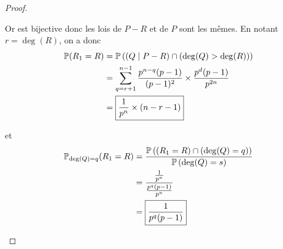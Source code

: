 \begin{proof}
\begin{enumerate}
        Or 
        est bijective donc les lois de $P-R$ et de $P$ sont les mêmes. En notant $r=\deg(R)$, on a donc 
        \begin{align}
            \P(R_{1}=R)
            &=\P\left((Q\mid P-R)\cap(\deg(Q)>\deg(R))\right)\\
            &=\sum_{q=r+1}^{n-1}\frac{p^{n-q}(p-1)}{(p-1)^{2}}\times\frac{p^{d}(p-1)}{p^{2n}}\\
            &=\boxed{\frac{1}{p^{n}}\times(n-r-1)}
        \end{align}

        et 
        \begin{align}
            \P_{\deg(Q)=q}(R_{1}=R)
            &=\frac{\P\left((R_{1}=R)\cap(\deg(Q)=q)\right)}{\P\left(\deg(Q)=s\right)}\\
            &=\frac{\frac{1}{p^{n}}}{\frac{p^{q}(p-1)}{p^{n}}}\\
            &=\boxed{\frac{1}{p^{q}(p-1)}}
        \end{align}
    \end{enumerate}
\end{proof}

